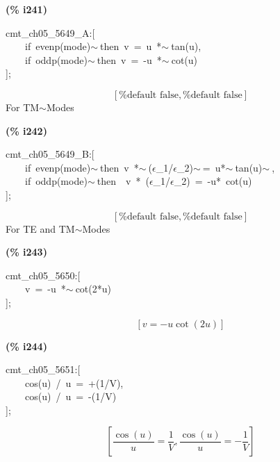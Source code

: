 \documentclass[fleqn]{article}
\begin{document}
\noindent
\begin{minipage}[t]{4.000000em}\color{red}\bfseries
(\% i241)	
\end{minipage}
\begin{minipage}[t]{\textwidth}\color{blue}
cmt\_ch05\_5649\_A:[\\
\ \ \ \ if\ evenp(mode)\ensuremath{\sim\ }then\ v\ =\ u\ *\ensuremath{\sim\ }tan(u),\\
\ \ \ \ if\ oddp(mode)\ensuremath{\sim\ }then\ v\ =\ -u\ *\ensuremath{\sim\ }cot(u)\\
];
\end{minipage}
\[\displaystyle \tag{\% o241} 
\left[ \mbox{%
false}\operatorname{,}\mbox{%
false}\right] \mbox{}
\]
For TM\ensuremath{\sim }Modes


\noindent
\begin{minipage}[t]{4.000000em}\color{red}\bfseries
(\% i242)	
\end{minipage}
\begin{minipage}[t]{\textwidth}\color{blue}
cmt\_ch05\_5649\_B:[\\
\ \ \ \ if\ evenp(mode)\ensuremath{\sim\ }then\ v\ *\ensuremath{\sim\ }(\ensuremath{\epsilon}\_1/\ensuremath{\epsilon}\_2)\ensuremath{\sim\ }=\ u*\ensuremath{\sim\ }tan(u)\ensuremath{\sim\ },\\
\ \ \ \ if\ oddp(mode)\ensuremath{\sim\ }then\ \ v\ *\ (\ensuremath{\epsilon}\_1/\ensuremath{\epsilon}\_2)\ =\ -u*\ cot(u)\\
];
\end{minipage}
\[\displaystyle \tag{\% o242} 
\left[ \mbox{%
false}\operatorname{,}\mbox{%
false}\right] \mbox{}
\]
For TE and TM\ensuremath{\sim }Modes


\noindent
\begin{minipage}[t]{4.000000em}\color{red}\bfseries
(\% i243)	
\end{minipage}
\begin{minipage}[t]{\textwidth}\color{blue}
cmt\_ch05\_5650:[\\
\ \ \ \ v\ =\ -u\ *\ensuremath{\sim\ }cot(2*u)\ \ \ \ \\
];
\end{minipage}
\[\displaystyle \tag{\% o243} 
\left[ v=-u \cot{\left( 2 u\right) }\right] \mbox{}
\]


\noindent
\begin{minipage}[t]{4.000000em}\color{red}\bfseries
(\% i244)	
\end{minipage}
\begin{minipage}[t]{\textwidth}\color{blue}
cmt\_ch05\_5651:[\\
\ \ \ \ cos(u)\ /\ u\ =\ +(1/V),\\
\ \ \ \ cos(u)\ /\ u\ =\ -(1/V)\\
];
\end{minipage}
\[\displaystyle \tag{\% o244} 
\left[ \frac{\cos{(u)}}{u}=\frac{1}{V}\operatorname{,}\frac{\cos{(u)}}{u}=-\frac{1}{V}\right] \mbox{}
\]
\end{document}
